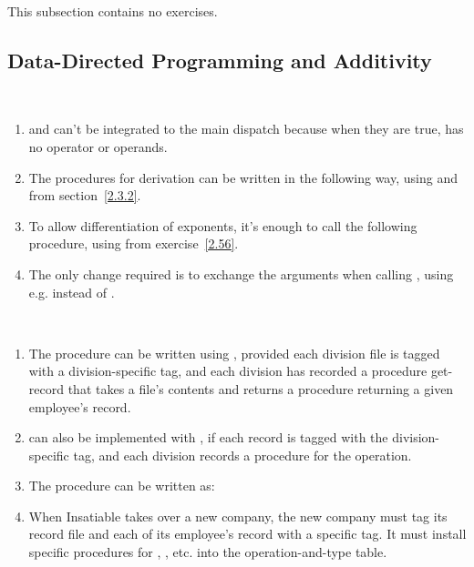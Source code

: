 This subsection contains no exercises.

\subsection{Data-Directed Programming and Additivity}

\begin{exe}[2.73]
    \label{2.73}
    \ \vspace{-20pt}
    \begin{enumerate}
        \item {} and  can’t be integrated to 
            the main dispatch because when they are true,  has no 
            operator or operands.

        \item The procedures for derivation can be written in the following way, 
            using  and  from 
            section~\ref{2.3.2}.

        \item To allow differentiation of exponents, it’s enough to call the 
            following procedure, using  from 
            exercise~\ref{2.56}.

        \item The only change required is to exchange the arguments when calling 
            , using e.g.  instead of 
            .
    \end{enumerate}
\end{exe}

\begin{exe}[2.74]
    \ \vspace{-20pt}
    \begin{enumerate}
        \item The  procedure can be written using 
            , provided each division file is tagged with 
            a division-specific tag, and each division has recorded a procedure 
            get-record that takes a file’s contents and returns a procedure 
            returning a given employee’s record.
        \item {} can also be implemented with 
            , if each record is tagged with the 
            division-specific tag, and each division records a procedure for the 
             operation.
        \item The  procedure can be written as:
        \item When Insatiable takes over a new company, the new company must tag 
            its record file and each of its employee’s record with a specific 
            tag. It must install specific procedures for , 
            , etc. into the operation-and-type table.
    \end{enumerate}
\end{exe}

